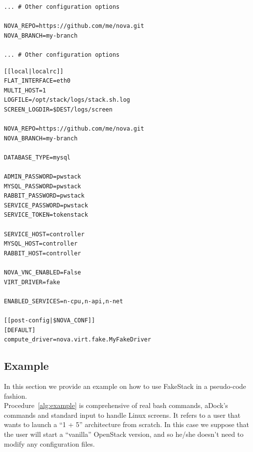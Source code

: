 \begin{lstlisting}[floatplacement=H, caption={Change repository URL}, label={lst:change_repo}, numbers=none]
... # Other configuration options

NOVA_REPO=https://github.com/me/nova.git
NOVA_BRANCH=my-branch

... # Other configuration options
\end{lstlisting}

\begin{lstlisting}[floatplacement=H, caption={Complete \texttt{local.conf} example for compute node}, label={lst:localconf_ex}]
[[local|localrc]]
FLAT_INTERFACE=eth0
MULTI_HOST=1
LOGFILE=/opt/stack/logs/stack.sh.log
SCREEN_LOGDIR=$DEST/logs/screen

NOVA_REPO=https://github.com/me/nova.git
NOVA_BRANCH=my-branch

DATABASE_TYPE=mysql

ADMIN_PASSWORD=pwstack
MYSQL_PASSWORD=pwstack
RABBIT_PASSWORD=pwstack
SERVICE_PASSWORD=pwstack
SERVICE_TOKEN=tokenstack

SERVICE_HOST=controller
MYSQL_HOST=controller
RABBIT_HOST=controller

NOVA_VNC_ENABLED=False
VIRT_DRIVER=fake

ENABLED_SERVICES=n-cpu,n-api,n-net

[[post-config|$NOVA_CONF]]
[DEFAULT]
compute_driver=nova.virt.fake.MyFakeDriver
\end{lstlisting}

\subsection{Example}
\label{sub:fakestack_ex}
In this section we provide an example on how to use FakeStack in a pseudo-code fashion.\\
Procedure~\ref{alg:example} is comprehensive of real bash commands, aDock's commands and standard input to handle Linux screens. It refers to a user that wants to launch a ``1 + 5'' architecture from scratch. In this case we suppose that the user will start a ``vanilla'' OpenStack version, and so he/she doesn't need to modify any configuration files.

